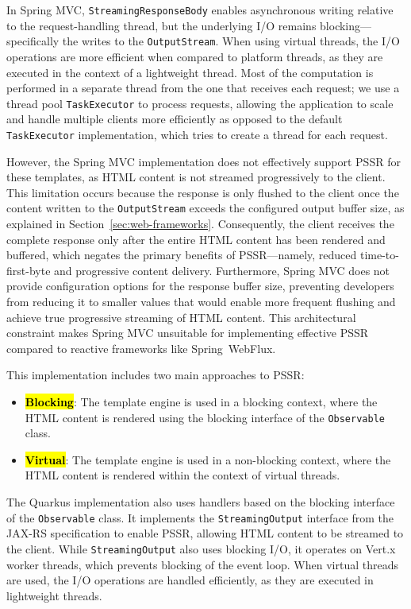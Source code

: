 \documentclass[software,article,accept,pdftex,moreauthors]{Definitions/mdpi}
\begin{document}
In Spring MVC, \texttt{StreamingResponseBody} enables asynchronous writing
relative to the request-handling thread, but the underlying I/O remains
blocking---specifically the writes to the \texttt{OutputStream}. When using
virtual threads, the I/O operations are more efficient when compared to
platform threads, as they are executed in the context of a lightweight thread.
Most of the computation is performed in a separate thread from the one that receives
each request; we use a thread pool \texttt{TaskExecutor} to process requests,
allowing the application to scale and handle multiple clients more efficiently
as opposed to the default \texttt{TaskExecutor} implementation, which tries to
create a thread for each request.

However, the Spring MVC implementation does not effectively support PSSR for
these templates, as HTML content is not streamed progressively to the client.
This limitation occurs because the response is only flushed to the client once
the content written to the \texttt{OutputStream} exceeds the configured output
buffer size, as explained in Section~\ref{sec:web-frameworks}. Consequently,
the client receives the complete response only after the entire HTML content
has been rendered and buffered, which negates the primary benefits of
PSSR---namely, reduced time-to-first-byte and progressive content delivery.
Furthermore, Spring MVC does not provide configuration options for the response
buffer size, preventing developers from reducing it to smaller values that
would enable more frequent flushing and achieve true progressive streaming of
HTML content. This architectural constraint makes Spring MVC unsuitable for
implementing effective PSSR compared to reactive frameworks like Spring~WebFlux.

This implementation includes two main approaches to PSSR\@:
\begin{itemize}
      \item \textbf{\hl{Blocking}}: The template engine is used in a blocking context,
            where the HTML content is rendered using the blocking interface of the
            \texttt{Observable} class.
      \item \textbf{\hl{Virtual}}: The template engine is used in a non-blocking context,
            where the HTML content is rendered within the context of virtual threads.
\end{itemize}

The Quarkus implementation also uses handlers based on the blocking interface
of the \texttt{Observable} class. It implements the \texttt{StreamingOutput}
interface from the JAX-RS specification to enable PSSR, allowing HTML content
to be streamed to the client. While \texttt{StreamingOutput} also uses blocking
I/O, it operates on Vert.x worker threads, which prevents blocking of the event
loop. When virtual threads are used, the I/O operations are handled
efficiently, as they are executed in lightweight threads.
\end{document}
